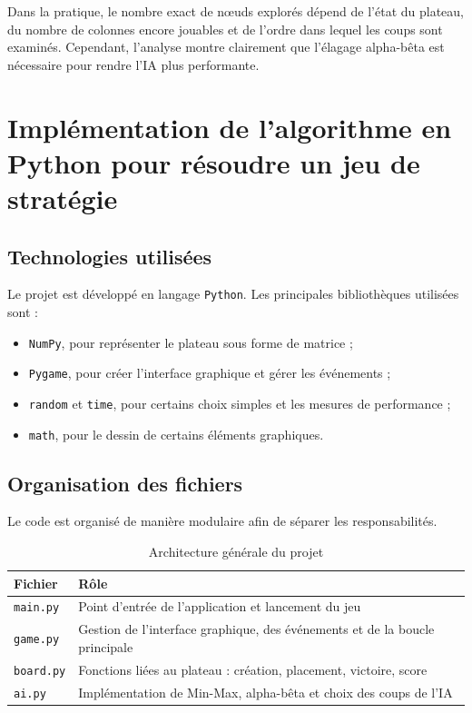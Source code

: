 \documentclass[12pt,a4paper]{article}
\begin{document}
Dans la pratique, le nombre exact de nœuds explorés dépend de l'état du plateau, du nombre de colonnes encore jouables et de l'ordre dans lequel les coups sont examinés. Cependant, l'analyse montre clairement que l'élagage alpha-bêta est nécessaire pour rendre l'IA plus performante.


\section{Implémentation de l'algorithme en Python pour résoudre un jeu de stratégie}

\subsection{Technologies utilisées}

Le projet est développé en langage \texttt{Python}. Les principales bibliothèques utilisées sont :

\begin{itemize}[leftmargin=1.2cm]
    \item \texttt{NumPy}, pour représenter le plateau sous forme de matrice ;
    \item \texttt{Pygame}, pour créer l'interface graphique et gérer les événements ;
    \item \texttt{random} et \texttt{time}, pour certains choix simples et les mesures de performance ;
    \item \texttt{math}, pour le dessin de certains éléments graphiques.
\end{itemize}

\subsection{Organisation des fichiers}

Le code est organisé de manière modulaire afin de séparer les responsabilités.

\begin{table}[H]
    \centering
    \begin{tabular}{p{3.5cm}p{9.5cm}}
        \toprule
        Fichier & Rôle \\
        \midrule
        \texttt{main.py} & Point d'entrée de l'application et lancement du jeu \\
        \texttt{game.py} & Gestion de l'interface graphique, des événements et de la boucle principale \\
        \texttt{board.py} & Fonctions liées au plateau : création, placement, victoire, score \\
        \texttt{ai.py} & Implémentation de Min-Max, alpha-bêta et choix des coups de l'IA \\
        \bottomrule
    \end{tabular}
    \caption{Architecture générale du projet}
\end{table}
\end{document}
